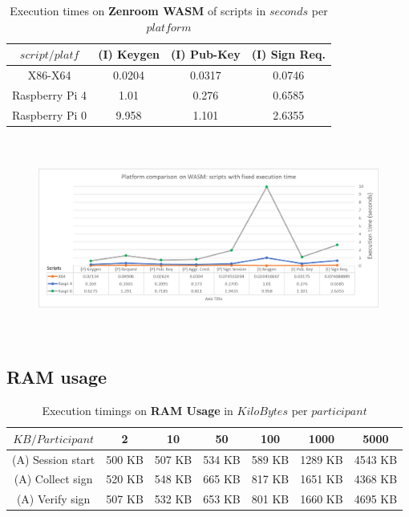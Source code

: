 \documentclass[twocolumn]{article}
\begin{document}
\begin{table}[h!]
  \begin{center}
    \caption{Execution times on \textbf{Zenroom WASM} of scripts in $seconds$ per $platform$}
      \label{tab:table1}
        \begin{tabular} {c|c|c|c}
          \toprule
\textbf{$script / platf$} &  \textbf{(I) Keygen}& \textbf{(I) Pub-Key}& \textbf{(I) Sign Req.} \\
          \midrule
X86-X64				&		0.0204	&	0.0317	&	0.0746	\\
Raspberry Pi  4	&		1.01	&	0.276	&	0.6585	\\
Raspberry Pi  0	&		9.958	&	1.101	&	2.6355	\\
      \bottomrule %
    \end{tabular}
  \end{center}
\end{table}


\begin{figure}[h!]
    \centering
    \includegraphics[width=6in, height=2.6in]{graphs/WASMfixed.png}
    \label{fig:galaxy}
\end{figure}



\newpage

\subsection*{RAM usage}

\begin{table}[h!]
  \begin{center}
    \caption{Execution timings on \textbf{RAM Usage} in $KiloBytes$ per $participant$}
      \label{tab:table1}
        \begin{tabular} {c|c|c|c|c|c|c}
          \toprule
           \textbf{$KB / Participant$} & \textbf{2} & \textbf{10} & \textbf{50} & \textbf{100} & \textbf{1000} & \textbf{5000} \\
          \midrule
            (A) Session start & 500 KB & 507 KB & 534 KB & 589 KB & 1289 KB & 4543 KB \\	
            (A) Collect sign & 520 KB & 548 KB & 665 KB & 817 KB & 1651 KB & 4368 KB	\\		
            (A) Verify sign & 507 KB & 532 KB & 653 KB & 801 KB & 1660 KB & 4695 KB	\\
      \bottomrule %
    \end{tabular}
  \end{center}
\end{table}
\end{document}
